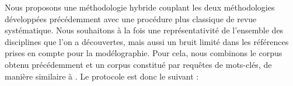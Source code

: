 Nous proposons une méthodologie hybride couplant les deux méthodologies développées précédemment avec une procédure plus classique de revue systématique. Nous souhaitons à la fois une représentativité de l'ensemble des disciplines que l'on a découvertes, mais aussi un bruit limité dans les références prises en compte pour la modélographie. Pour cela, nous combinons le corpus obtenu précédemment et un corpus constitué par requêtes de mots-clés, de manière similaire à \cite{tahamtan2018core}. Le protocole est donc le suivant :

%
%  
%
% 
%


